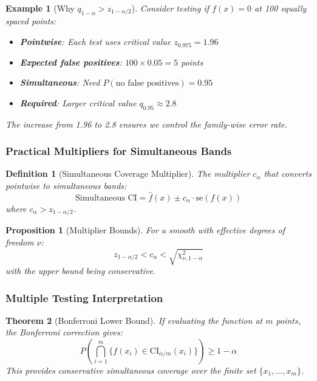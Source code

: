 \documentclass[12pt]{article}
\newtheorem{theorem}{Theorem}
\newtheorem{proposition}[theorem]{Proposition}
\newtheorem{definition}{Definition}
\newtheorem{example}{Example}
\begin{document}
\begin{example}[Why $q_{1-\alpha} > z_{1-\alpha/2}$]
Consider testing if $f(x) = 0$ at 100 equally spaced points:
\begin{itemize}
   \item \textbf{Pointwise}: Each test uses critical value $z_{0.975} = 1.96$
   \item \textbf{Expected false positives}: $100 \times 0.05 = 5$ points
   \item \textbf{Simultaneous}: Need $P(\text{no false positives}) = 0.95$
   \item \textbf{Required}: Larger critical value $q_{0.95} \approx 2.8$
\end{itemize}
The increase from 1.96 to 2.8 ensures we control the family-wise error rate.
\end{example}

\subsubsection{Practical Multipliers for Simultaneous Bands}

\begin{definition}[Simultaneous Coverage Multiplier]
The multiplier $c_\alpha$ that converts pointwise to simultaneous bands:
\begin{equation}
\text{Simultaneous CI} = \hat{f}(x) \pm c_\alpha \cdot \text{se}(f(x))
\end{equation}
where $c_\alpha > z_{1-\alpha/2}$.
\end{definition}

\begin{proposition}[Multiplier Bounds]
For a smooth with effective degrees of freedom $\nu$:
\begin{equation}
z_{1-\alpha/2} < c_\alpha < \sqrt{\chi^2_{\nu,1-\alpha}}
\end{equation}
with the upper bound being conservative.
\end{proposition}

\subsubsection{Multiple Testing Interpretation}

\begin{theorem}[Bonferroni Lower Bound]
If evaluating the function at $m$ points, the Bonferroni correction gives:
\begin{equation}
P\left(\bigcap_{i=1}^m \{f(x_i) \in \text{CI}_{\alpha/m}(x_i)\}\right) \geq 1-\alpha
\end{equation}
This provides conservative simultaneous coverage over the finite set $\{x_1, \ldots, x_m\}$.
\end{theorem}
\end{document}

